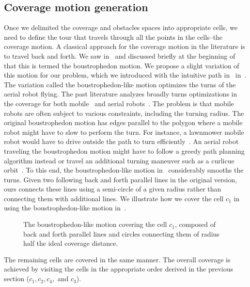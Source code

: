 \subsection{Coverage motion generation}
\label{sec:cov-motion}

Once we delimited the coverage and obstacles spaces into appropriate cells, we need to define the tour that travels through all the points in the cells--the coverage motion. A classical approach for the coverage motion in the literature is to travel back and forth. We saw in~ and discussed briefly at the beginning of~ that this is termed the boustrophedon motion. We propose a slight variation of this motion for our problem, which we introduced with the intuitive path in~ in~. The variation called the boustrophedon-like motion optimizes the turns of the aerial robot flying. The past literature analyzes broadly turns optimizations in the coverage for both mobile~\citep{huang2001optimal} and aerial robots~\citep{artemenko2016energy,li2011coverage}. The problem is that mobile robots are often subject to various constraints, including the turning radius. The original boustrophedon motion has edges parallel to the polygon where a mobile robot might have to slow to perform the turn. For instance, a lawnmower mobile robot would have to drive outside the path to turn efficiently~\citep{huang2001optimal}. An aerial robot traveling the boustrophedon motion might have to follow a greedy path planning algorithm instead or travel an additional turning maneuver such as a curlicue orbit~\citep{xu2011optimal,xu2014efficient}. To this end, the boustrophedon-like motion in~ considerably smooths the turns. Given two following back and forth parallel lines in the original version, ours connects these lines using a semi-circle of a given radius rather than connecting them with additional lines. We illustrate how we cover the cell $c_1$ in~ using the boustrophedon-like motion in~. 
\begin{figure}[h]
  \centering
  \selectfont
  
  \caption[Boustrophedon-like motion covering a cell]{The boustrophedon-like motion covering the cell $c_1$, composed of back and forth parallel lines and circles connecting them of radius half the ideal coverage distance.}
  \label{fig:bm}
\end{figure}
The remaining cells are covered in the same manner. The overall coverage is achieved by visiting the cells in the appropriate order derived in the previous section ($c_1,c_2,c_4,$ and $c_3$).

